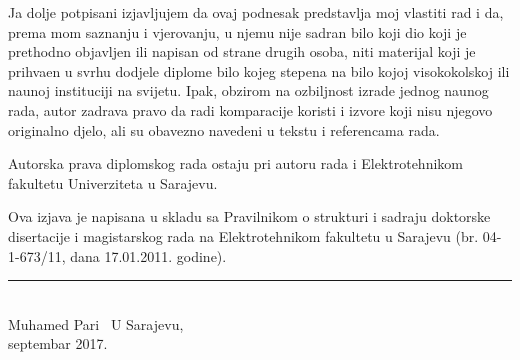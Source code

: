 Ja dolje potpisani izjavljujem da ovaj podnesak predstavlja moj vlastiti rad i da, prema mom
saznanju i vjerovanju, u njemu nije sadr\zh an bilo koji dio koji je prethodno objavljen ili napisan
od strane drugih osoba, niti materijal koji je prihva\cj en u svrhu dodjele diplome bilo kojeg
stepena na bilo kojoj visoko\sh kolskoj ili nau\ch noj instituciji na svijetu. Ipak, obzirom na ozbiljnost
izrade jednog nau\ch nog rada, autor zadr\zh ava pravo da radi komparacije koristi i izvore
koji nisu njegovo originalno djelo, ali su obavezno navedeni u tekstu i referencama rada.

Autorska prava diplomskog rada ostaju pri autoru rada i Elektrotehni\ch kom fakultetu Univerziteta
u Sarajevu.

Ova izjava je napisana u skladu sa Pravilnikom o strukturi i sadr\zh aju doktorske disertacije i 
magistarskog rada na Elektrotehni\ch kom fakultetu u Sarajevu (br. 04-1-673/11, dana 17.01.2011.
godine).
\vfill
\begin{center}
\noindent\rule{8cm}{0.4pt}\\
Muhamed Pari\cj\ 
\vfill
U Sarajevu,\\
septembar 2017.
\end{center}